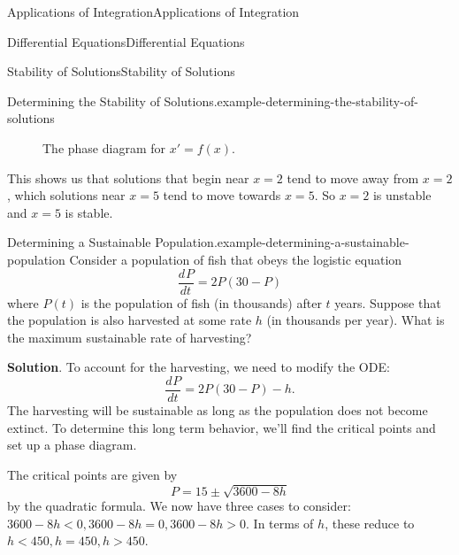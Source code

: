 \documentclass[10pt,]{book}
\numberwithin{equation}{section}
\newcommand{\dv}[3][]{\dfrac{d^{#1} #2}{d #3^{#1}}}
\newcommand{\lt}{<}
\newcommand{\gt}{>}
\begin{document}
\begin{chapterptx}{Applications of Integration}{}{Applications of Integration}{}{}
\begin{sectionptx}{Differential Equations}{}{Differential Equations}{}{}
\begin{subsectionptx}{Stability of Solutions}{}{Stability of Solutions}{}{}
\begin{example}{Determining the Stability of Solutions.}{example-determining-the-stability-of-solutions}
\begin{figure}
{
}
\caption{The phase diagram for \(x' = f(x).\)\label{figure-21}}
\end{figure}
\hypertarget{p-759}{}%
This shows us that solutions that begin near \(x = 2\) tend to move away from \(x = 2\), which solutions near \(x = 5\) tend to move towards \(x = 5\). So \(x = 2\) is unstable and \(x = 5\) is stable.%
\end{example}
\begin{example}{Determining a Sustainable Population.}{example-determining-a-sustainable-population}%
\hypertarget{p-760}{}%
Consider a population of fish that obeys the logistic equation%
\begin{equation*}
\dv{P}{t} = 2P(30 - P)
\end{equation*}
where \(P(t)\) is the population of fish (in thousands) after \(t\) years. Suppose that the population is also harvested at some rate \(h\) (in thousands per year). What is the maximum sustainable rate of harvesting?%
\par\smallskip%
\noindent\textbf{Solution}.\hypertarget{solution-160}{}\quad%
\hypertarget{p-761}{}%
To account for the harvesting, we need to modify the ODE:%
\begin{equation*}
\dv{P}{t} = 2P(30 - P) - h.
\end{equation*}
The harvesting will be sustainable as long as the population does not become extinct. To determine this long term behavior, we'll find the critical points and set up a phase diagram.%
\par
\hypertarget{p-762}{}%
The critical points are given by%
\begin{equation*}
P = 15 \pm \sqrt{3600 - 8h}
\end{equation*}
by the quadratic formula. We now have three cases to consider: \(3600 - 8h \lt 0, 3600 - 8h = 0, 3600 - 8h \gt 0.\) In terms of \(h\), these reduce to \(h \lt 450, h = 450, h \gt 450\).%

\end{example}
\end{subsectionptx}
\end{sectionptx}
\end{chapterptx}
\end{document}
